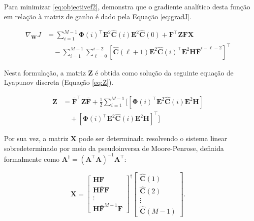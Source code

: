 \documentclass[journal]{IEEEtran}
\begin{document}
Para minimizar \eqref{eq:objectivef2}, \cite{zhang2020} demonstra que o gradiente analítico desta função em relação à matriz de ganho é dado pela Equação \eqref{eq:gradJ}.

\begin{equation}
    \label{eq:gradJ}
    \begin{split}
        \nabla_{\mathbf{W}} J &= \sum_{i=1}^{M-1} \mathbf{\Phi}(i)^\top \mathbf{E}^2 \hat{\mathbf{C}}(i) \mathbf{E}^2 \hat{\mathbf{C}}(0) + \mathbf{F}^\top \mathbf{Z} \mathbf{F} \mathbf{X} \\
        &\quad - \sum_{i=1}^{M-1} \sum_{\ell=0}^{i-2} \left[ \hat{\mathbf{C}}(\ell+1) \mathbf{E}^2 \hat{\mathbf{C}}(i)^\top \mathbf{E}^2 \mathbf{H} \bar{\mathbf{F}}^{i-\ell-2} \right]^\top 
    \end{split}
\end{equation}

Nesta formulação, a matriz $\mathbf{Z}$ é obtida como solução da seguinte equação de Lyapunov discreta (Equação \ref{eq:Z}).

\begin{equation}
    \label{eq:Z}
    \begin{split}
        \mathbf{Z} &= \bar{\mathbf{F}}^\top \mathbf{Z} \bar{\mathbf{F}} + \frac{1}{2}\sum_{i=1}^{M-1} \Bigg[ \left[ \mathbf{\Phi}(i)^\top \mathbf{E}^2 \hat{\mathbf{C}}(i) \mathbf{E}^2 \mathbf{H} \right] \\
        &\quad + \left[ \mathbf{\Phi}(i)^\top \mathbf{E}^2 \hat{\mathbf{C}}(i) \mathbf{E}^2 \mathbf{H} \right]^\top \Bigg]
    \end{split}
\end{equation}

Por sua vez, a matriz $\mathbf{X}$ pode ser determinada resolvendo o sistema linear sobredeterminado por meio da pseudoinversa de Moore-Penrose, definida formalmente como $\mathbf{A}^{\dagger} = (\mathbf{A}^\top \mathbf{A})^{-1}\mathbf{A}^\top$:

\begin{equation}
    \label{eq:X}
    \mathbf{X} = \begin{bmatrix} 
    \mathbf{H}\mathbf{F} \\ 
    \mathbf{H}\bar{\mathbf{F}}\mathbf{F} \\ 
    \vdots \\ 
    \mathbf{H}\bar{\mathbf{F}}^{M-1}\mathbf{F} 
    \end{bmatrix}^{\dagger} 
    \begin{bmatrix} 
    \hat{\mathbf{C}}(1) \\ 
    \hat{\mathbf{C}}(2) \\ 
    \vdots \\ 
    \hat{\mathbf{C}}(M - 1) 
    \end{bmatrix}.
\end{equation}
\end{document}

